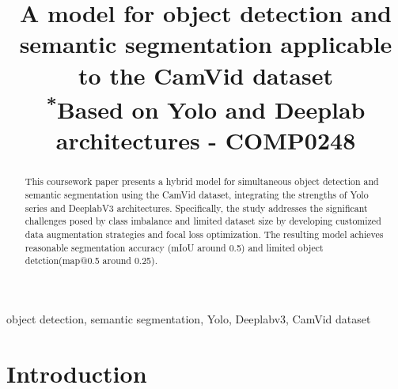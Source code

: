 \documentclass[conference]{IEEEtran}
\begin{document}
\title{A model for object detection and semantic segmentation applicable to the CamVid dataset\\
{\footnotesize \textsuperscript{*}Based on Yolo and Deeplab architectures - COMP0248}
}

\author{}

\maketitle

\begin{abstract}


 This coursework paper presents a hybrid model for simultaneous object detection and semantic segmentation using the CamVid dataset, integrating the strengths of Yolo series and DeeplabV3 architectures. Specifically, the study addresses the significant challenges posed by class imbalance and limited dataset size by developing customized data augmentation strategies and focal loss optimization. The resulting model achieves reasonable segmentation accuracy (mIoU around 0.5) and limited object detction(map@0.5 around 0.25).

\end{abstract}

\begin{IEEEkeywords}
object detection, semantic segmentation, Yolo, Deeplabv3, CamVid dataset
\end{IEEEkeywords}

\section{Introduction}


\end{document}
